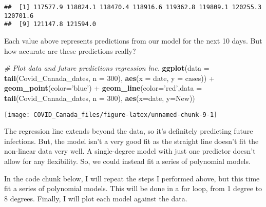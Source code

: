 \documentclass[]{tufte-handout}
\newenvironment{Shaded}{}{}
\newcommand{\CommentTok}[1]{\textcolor[rgb]{0.38,0.63,0.69}{\textit{#1}}}
\newcommand{\DataTypeTok}[1]{\textcolor[rgb]{0.56,0.13,0.00}{#1}}
\newcommand{\DecValTok}[1]{\textcolor[rgb]{0.25,0.63,0.44}{#1}}
\newcommand{\KeywordTok}[1]{\textcolor[rgb]{0.00,0.44,0.13}{\textbf{#1}}}
\newcommand{\NormalTok}[1]{#1}
\newcommand{\OperatorTok}[1]{\textcolor[rgb]{0.40,0.40,0.40}{#1}}
\newcommand{\StringTok}[1]{\textcolor[rgb]{0.25,0.44,0.63}{#1}}
\begin{document}
\begin{verbatim}
##  [1] 117577.9 118024.1 118470.4 118916.6 119362.8 119809.1 120255.3 120701.6
##  [9] 121147.8 121594.0
\end{verbatim}

Each value above represents predictions from our model for the next 10
days. But how accurate are these predictions really?

\begin{Shaded}
\begin{Highlighting}[]
\CommentTok{# Plot data and future predictions regression lne.}
\KeywordTok{ggplot}\NormalTok{(}\DataTypeTok{data =} \KeywordTok{tail}\NormalTok{(Covid_Canada_dates, }\DataTypeTok{n =} \DecValTok{300}\NormalTok{), }\KeywordTok{aes}\NormalTok{(}\DataTypeTok{x =}\NormalTok{ date, }\DataTypeTok{y =}\NormalTok{ cases)) }\OperatorTok{+}\StringTok{ }
\StringTok{  }\KeywordTok{geom_point}\NormalTok{(}\DataTypeTok{color=}\StringTok{'blue'}\NormalTok{)  }\OperatorTok{+}
\StringTok{  }\KeywordTok{geom_line}\NormalTok{(}\DataTypeTok{color=}\StringTok{'red'}\NormalTok{,}\DataTypeTok{data =} \KeywordTok{tail}\NormalTok{(Covid_Canada_dates, }\DataTypeTok{n =} \DecValTok{300}\NormalTok{), }\KeywordTok{aes}\NormalTok{(}\DataTypeTok{x=}\NormalTok{date, }\DataTypeTok{y=}\NormalTok{New))}
\end{Highlighting}
\end{Shaded}

\texttt{[image: COVID\_Canada\_files/figure-latex/unnamed-chunk-9-1]}

The regression line extends beyond the data, so it's definitely
predicting future infections. But, the model isn't a very good fit as
the straight line doesn't fit the non-linear data very well. A
single-degree model with just one predictor doesn't allow for any
flexibility. So, we could instead fit a series of polynomial models.

In the code chunk below, I will repeat the steps I performed above, but
this time fit a series of polynomial models. This will be done in a for
loop, from 1 degree to 8 degrees. Finally, I will plot each model
against the data.
\end{document}

